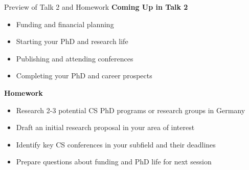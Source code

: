 \documentclass[aspectratio=169,10pt]{beamer}
\begin{document}
\begin{frame}{Preview of Talk 2 and Homework}
    \textbf{Coming Up in Talk 2}
    \begin{itemize}
        \item Funding and financial planning
        \item Starting your PhD and research life
        \item Publishing and attending conferences
        \item Completing your PhD and career prospects
    \end{itemize}
    
    \textbf{Homework}
    \begin{itemize}
        \item Research 2-3 potential CS PhD programs or research groups in Germany
        \item Draft an initial research proposal in your area of interest
        \item Identify key CS conferences in your subfield and their deadlines
        \item Prepare questions about funding and PhD life for next session
    \end{itemize}
\end{frame}
\end{document}
